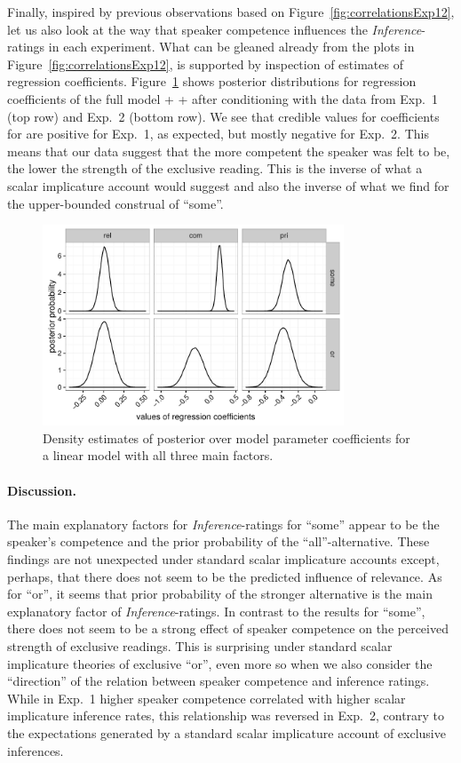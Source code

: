 \documentclass[12pt]{article}
\begin{document}
Finally, inspired by previous observations based on Figure~\ref{fig:correlationsExp12}, let us
also look at the way that speaker competence influences the \emph{Inference}-ratings in each
experiment. What can be gleaned already from the plots in Figure~\ref{fig:correlationsExp12},
is supported by inspection of estimates of regression
coefficients. Figure~\ref{fig:densityMCMC} shows posterior distributions for regression
coefficients of the full model \rel + \com + \pri after conditioning with the data from Exp.~1
(top row) and Exp.~2 (bottom row). We see that credible values for coefficients for \com are
positive for Exp.~1, as expected, but mostly negative for Exp.~2. This means that our data
suggest that the more competent the speaker was felt to be, the lower the strength of the
exclusive reading. This is the inverse of what a scalar implicature account would suggest and
also the inverse of what we find for the upper-bounded construal of ``some''. 

\begin{figure}
  \centering
  \includegraphics[width=0.8\textwidth]{pics_02/densityMCMCExp12.pdf}
  \caption{Density estimates of posterior over model parameter coefficients for a linear model
    with all three main factors.}
  \label{fig:densityMCMC}
\end{figure}

\paragraph{Discussion.} The main explanatory factors for \emph{Inference}-ratings for ``some''
appear to be the speaker's competence and the prior probability of the ``all''-alternative. These
findings are not unexpected under standard scalar implicature accounts except, perhaps, that
there does not seem to be the predicted influence of relevance. As for ``or'', it seems that
prior probability of the stronger alternative is the main explanatory factor of
\emph{Inference}-ratings. In contrast to the results for ``some'', there does not seem to be a
strong effect of speaker competence on the perceived strength of exclusive readings. This is
surprising under standard scalar implicature theories of exclusive ``or'', even more so when we
also consider the ``direction'' of the relation between speaker competence and inference
ratings. While in Exp.~1 higher speaker competence correlated with higher scalar implicature
inference rates, this relationship was reversed in Exp.~2, contrary to the expectations
generated by a standard scalar implicature account of exclusive inferences.
\end{document}
